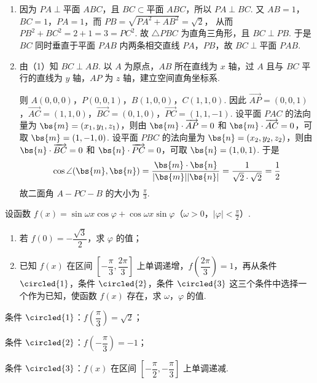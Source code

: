 \begin{solution}
\begin{enumerate}
\item 因为 \(PA\perp \text{平面 }ABC\)，且 \(BC\subset \text{平面 }ABC\)，所以
\(PA\perp BC\).
又 \(AB=1\)，\(BC=1\)，\(PA=1\)，而
\(PB=\sqrt{PA^2+AB^2}=\sqrt{2}\)，
从而 \(PB^2+BC^2=2+1=3=PC^2\).
故 \(\triangle PBC\) 为直角三角形，且
\(BC\perp PB\).
于是 \(BC\) 同时垂直于平面 \(PAB\) 内两条相交直线 \(PA\)，\(PB\)，故
\(BC\perp \text{平面 }PAB\).

\item 由（1）知 \(BC\perp AB\). 以 \(A\) 为原点，\(AB\) 所在直线为 \(x\) 轴，过 \(A\) 且与 \(BC\) 平行的直线为 \(y\) 轴，\(AP\) 为 \(z\) 轴，建立空间直角坐标系.


则
\(A(0,0,0)\)，\(P(0,0,1)\)，\(B(1,0,0)\)，\(C(1,1,0)\).
因此 \(\overrightarrow{AP}=(0,0,1)\)，\(\overrightarrow{AC}=(1,1,0)\)，\(\overrightarrow{BC}=(0,1,0)\)，\(\overrightarrow{PC}=(1,1,-1)\).
设平面 \(PAC\) 的法向量为 \(\bs{m}=(x_1,y_1,z_1)\)，则由 \(\bs{m}\cdot \overrightarrow{AP}=0\) 和 \(\bs{m}\cdot \overrightarrow{AC}=0\)，可取 \(\bs{m}=(1,-1,0)\).
设平面 \(PBC\) 的法向量为 \(\bs{n}=(x_2,y_2,z_2)\)，则由 \(\bs{n}\cdot \overrightarrow{BC}=0\) 和 \(\bs{n}\cdot \overrightarrow{PC}=0\)，可取 \(\bs{n}=(1,0,1)\).
于是
\[
\cos \angle(\bs{m},\bs{n}) =\frac{\bs{m}\cdot \bs{n}}{|\bs{m}||\bs{n}|} =\frac{1}{\sqrt{2}\cdot \sqrt{2}} =\frac{1}{2}
\]
故二面角 \(A-PC-B\) 的大小为 \(\frac{\pi}{3}\).
\end{enumerate}
\end{solution}

\begin{problem}
设函数 \(f(x)=\sin \omega x\cos \varphi+\cos \omega x\sin \varphi\)（\(\omega>0\)，\(|\varphi|<\frac{\pi}{2}\)）.

\begin{enumerate}
\item 若 \(f(0)=-\dfrac{\sqrt{3}}{2}\)，求 \(\varphi\) 的值；
\item 已知 \(f(x)\) 在区间 \(\left[-\dfrac{\pi}{3},\dfrac{2\pi}{3}\right]\) 上单调递增，\(f\left(\dfrac{2\pi}{3}\right)=1\)，再从条件 \(\circled{1}\)，条件 \(\circled{2}\)，条件 \(\circled{3}\) 这三个条件中选择一个作为已知，使函数 \(f(x)\) 存在，求 \(\omega\)，\(\varphi\) 的值.
\end{enumerate}

条件 \(\circled{1}\)：\(f\left(\dfrac{\pi}{3}\right)=\sqrt{2}\)；

条件 \(\circled{2}\)：\(f\left(-\dfrac{\pi}{3}\right)=-1\)；

条件 \(\circled{3}\)：\(f(x)\) 在区间 \(\left[-\dfrac{\pi}{2},-\dfrac{\pi}{3}\right]\) 上单调递减.
\end{problem}


